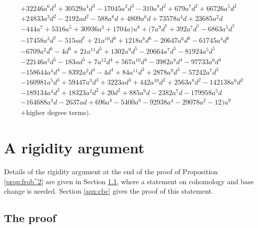 \documentclass{gtpart}
\theoremstyle{definition}
\theoremstyle{remark}
\begin{document}
\begin{equation*}
\begin{split}
      & + 32246 a^6 d^3 + 30529 a^4 d^3 - 17045 a^2 d^3 - 310 a^9 d^2 + 679 a^7 d^2 + 66726 a^5 d^2 \\
      & + 24833 a^3 d^2 - 2192 a d^2 - 588 a^8 d + 4809 a^6 d + 73578 a^4 d + 23685 a^2 d \\
      & - 444 a^7 + 5316 a^5 + 30936 a^3 + 1704 a) u^8 + (7 a^9 d^7 + 392 a^7 d^7 - 6863 a^5 d^7 \\
      & - 17458 a^3 d^7 - 515 a d^7 + 21 a^{10} d^6 + 1218 a^8 d^6 - 20647 a^6 d^6 - 61745 a^4 d^6 \\
      & - 6709 a^2 d^6 - 4 d^6 + 21 a^{11} d^5 + 1302 a^9 d^5 - 20664 a^7 d^5 - 81924 a^5 d^5 \\
      & - 22146 a^3 d^5 - 183 a d^5 + 7 a^{12} d^4 + 567 a^{10} d^4 - 3982 a^8 d^4 - 97733 a^6 d^4 \\
      & - 158644 a^4 d^4 - 8392 a^2 d^4 - 4 d^4 + 84 a^{11} d^3 + 2878 a^9 d^3 - 57242 a^7 d^3 \\
      & - 160981 a^5 d^3 + 59447 a^3 d^3  +3223 a d^3 + 442 a^{10} d^2 + 2563 a^8 d^2 - 142138 a^6 d^2 \\
      & - 189134 a^4 d^2 + 18323 a^2 d^2 + 20 d^2 + 885 a^9 d - 2382 a^7 d - 179958 a^5 d \\
      & - 164688 a^3 d - 2637 a d + 696 a^8 - 5400 a^6 - 92938 a^4 - 29078 a^2 - 12) u^9 \\
      & + \text{higher degree terms} \big).  
\end{split}
\end{equation*}


\section{A rigidity argument}
\label{apx:ag}

Details of the rigidity argument at the end of the proof of Proposition \ref{prop:frob^2} are given in Section \ref{apx:pf}, 
where a statement on cohomology and base change is needed.  Section \ref{apx:cbc} gives the proof of this statement.  


\subsection{The proof}
\label{apx:pf}
\end{document}
